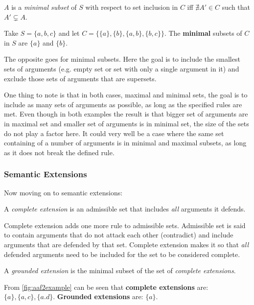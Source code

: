             \begin{definition}
                $A$ is a \textit{minimal subset} of $S$ with respect to set inclusion in $C$ iff $\nexists A' \in C$ such that $A' \subsetneq A$.
                \label{definition:definition6}
            \end{definition}
            \begin{exa}
                Take $S = \{a, b, c\}$ and let $C = \{\{a\}, \{b\}, \{a, b\}, \{b, c\}\}$. The \textbf{minimal} subsets of $C$ in $S$ are $\{a\}$ and $\{b\}$.
                \label{exa:example6}
            \end{exa}
            
            The opposite goes for minimal subsets. Here the goal is to include the smallest sets of arguments (e.g. empty set or set with only a single argument in it) and exclude those sets of arguments that are supersets. 
            
            One thing to note is that in both cases, maximal and minimal sets, the goal is to include as many sets of arguments as possible, as long as the specified rules are met. Even though in both examples the result is that bigger set of arguments are in maximal set and smaller set of arguments is in minimal set, the size of the sets do not play a factor here. It could very well be a case where the same set containing of a number of arguments is in minimal and maximal subsets, as long as it does not break the defined rule.
        
        \subsubsection{Semantic Extensions}
            Now moving on to semantic extensions:
            \begin{definition}
                A \textit{complete extension} is an admissible set that includes \textit{all} arguments it defends.
                \label{definition:definition7}
            \end{definition}
            
            Complete extension adds one more rule to admissible sets. Admissible set is said to contain arguments that do not attack each other (contradict) and include arguments that are defended by that set. Complete extension makes it so that \textit{all} defended arguments need to be included for the set to be considered complete.
            
            \begin{definition}
                A \textit{grounded extension} is the minimal subset of the set of \textit{complete extensions}.
                \label{definition:definition8}
            \end{definition}
            \begin{exa}
                From \autoref{fig:aaf2example} can be seen that \textbf{complete extensions} are: $\{a\}, \{a, c\}, \{a. d\}$. \textbf{Grounded extensions} are: $\{a\}$.
                \label{exa:example8}
            \end{exa}
            
